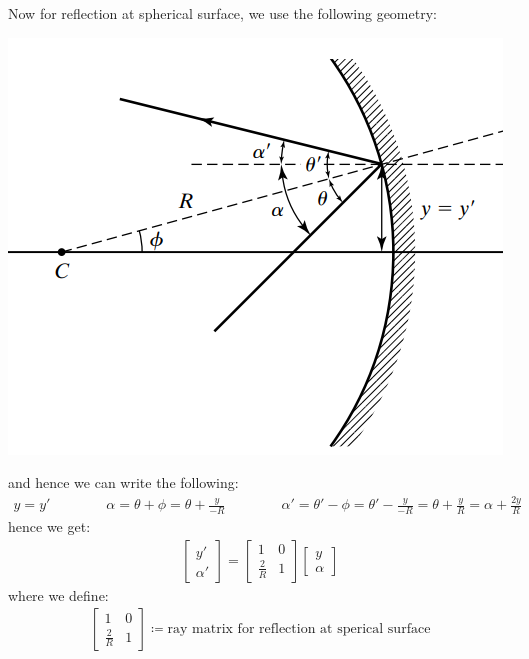 \documentclass[11pt]{book}
\theoremstyle{break}
\theoremstyle{break}
\newcommand{\bmat}[1]{\begin{bmatrix} #1 \end{bmatrix}}
\begin{document}
Now for reflection at spherical surface, we use the following geometry:
\begin{center}
\includegraphics[scale=0.55]{reflecM.png}
\end{center}
and hence we can write the following:
\begin{align*}
y = y' \qquad\qquad\alpha = \theta + \phi = \theta + \frac{y}{-R}\qquad\qquad \alpha' = \theta' - \phi = \theta' - \frac{y}{-R} = \theta+ \frac{y}{R} = \alpha + \frac{2y}{R}
\end{align*}
hence we get:
\begin{align*}
\bmat{y' \\ \alpha'} = \bmat{1 & 0 \\ \frac{2}{R} & 1} \bmat{y \\ \alpha}
\end{align*}
where we define:
\begin{align*}
\bmat{1 & 0 \\ \frac{2}{R} & 1} \coloneqq \text{ray matrix for reflection at sperical surface}
\end{align*}
\end{document}
